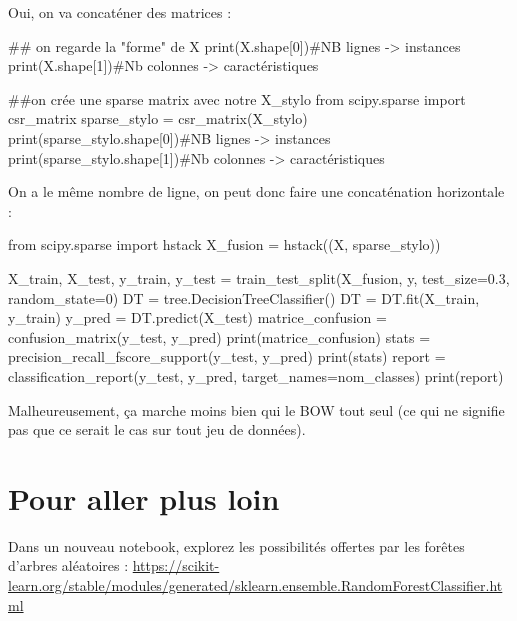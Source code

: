 Oui, on va concaténer des matrices :

\begin{python}
## on regarde la "forme" de X
print(X.shape[0])#NB lignes   -> instances
print(X.shape[1])#Nb colonnes -> caractéristiques

##on crée une sparse matrix avec notre X_stylo
from scipy.sparse import csr_matrix
sparse_stylo = csr_matrix(X_stylo)
print(sparse_stylo.shape[0])#NB lignes   -> instances
print(sparse_stylo.shape[1])#Nb colonnes -> caractéristiques
\end{python}
On a le même nombre de ligne, on peut donc faire une concaténation horizontale :
\begin{python}
from scipy.sparse import hstack
X_fusion = hstack((X, sparse_stylo))
\end{python}

\begin{python}
X_train, X_test, y_train, y_test = train_test_split(X_fusion, y, test_size=0.3, random_state=0)
DT = tree.DecisionTreeClassifier()
DT = DT.fit(X_train, y_train)
y_pred = DT.predict(X_test)
matrice_confusion = confusion_matrix(y_test, y_pred)
print(matrice_confusion)
stats = precision_recall_fscore_support(y_test, y_pred)
print(stats)
report = classification_report(y_test, y_pred, target_names=nom_classes)
print(report)
\end{python}
Malheureusement, ça marche moins bien qui le BOW tout seul (ce qui ne signifie pas que ce serait le cas sur tout jeu de données).

\section{Pour aller plus loin}

Dans un nouveau notebook, explorez les possibilités offertes par les forêtes d'arbres aléatoires : \small{\url{https://scikit-learn.org/stable/modules/generated/sklearn.ensemble.RandomForestClassifier.html}}


